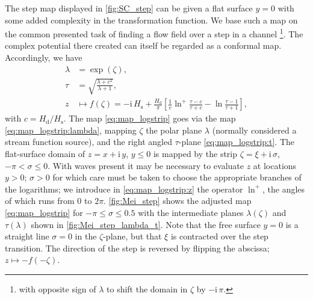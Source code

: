 \documentclass[internal]{sintefmemo}
\newcommand{\mr}{\mathrm}
\let\SSS\S
\renewcommand{\S}{^\mr{S}}
\newcommand{\ii}{\mr{i}\,}
\renewcommand{\_}[1]{_\mr{#1}}
\newcommand{\z}{z}
\newcommand{\x}{x}
\newcommand{\y}{y}
\newcommand{\zz}{\zeta}
\newcommand{\xx}{\xi}
\newcommand{\yy}{\sigma}
\newcommand{\zmap}{f}
\begin{document}
The step map displayed in \autoref{fig:SC_step} can be given a flat surface $y=0$ with some added complexity in the transformation function.
We base such a map on the common presented task of finding a flow field over a step in a channel \citep[e.g.,][\SSS 4.3.2]{mei_2005}\footnote{with opposite sign of $\lambda$ to shift the domain in $\zz$ by $-\ii\pi$.}.
The complex potential there created can itself be regarded as a conformal map.
Accordingly, we have
\begin{subequations}
\begin{align}
\lambda &= \exp(\zz),\label{eq:map_logstrip:lambda}\\
\tau &= \sqrt{\frac{\lambda+c^2}{\lambda+1} },\label{eq:map_logstrip:t}\\
z &\mapsto \zmap(\zz) = -\ii H\_s +\frac{H\_d}{\pi}\left[ 
\frac1c \ln^+\frac{\tau-c}{\tau+c} - \ln\frac{\tau-1}{\tau+1}
\right]\label{eq:map_logstrip:z},
\end{align}%
\label{eq:map_logstrip}%
\end{subequations}%
with $c = H\_d/H\_s$.
The map \eqref{eq:map_logstrip} goes via the map \eqref{eq:map_logstrip:lambda}, mapping $\zz$ the polar plane $\lambda$ (normally considered a stream function source), and the right angled $\tau$-plane \eqref{eq:map_logstrip:t}.
The flat-surface domain of $z=\x+\ii\y$, $\y\leq0$ is mapped by the strip $\zz=\xx+\ii\yy$, $-\pi<\yy\leq0$.
With waves present it may be necessary to evaluate $\z$ at locations $\y>0$; $\yy>0$ for which care must be taken to choose the appropriate branches of the logarithms;
we introduce in \eqref{eq:map_logstrip:z} the operator $\ln^+$, the angles of which runs from $0$ to $2\pi$. 
\autoref{fig:Mei_step} shows the adjusted map \eqref{eq:map_logstrip} for $-\pi\leq\yy\leq0.5$ with the intermediate planes $\lambda(\zz)$ and $\tau(\lambda)$ shown in \autoref{fig:Mei_step_lambda_t}.
Note that the free surface $\y=0$ is a straight line  $\yy=0$ in the $\zz$-plane, but that $\xx$ is contracted over the step transition.
The direction of the step is reversed by flipping the abscissa; $z\mapsto-f(-\zz)$.  
\end{document}
